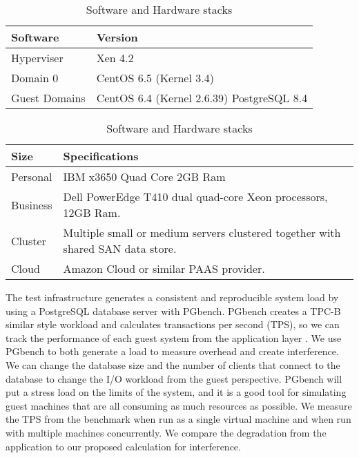 \begin{table}[h]
\begin{subtable}[h]{0.45\textwidth}
\begin{tabular}{ l p{5cm} }
  Software & Version \\
  \hline
  Hyperviser & Xen 4.2 \\
  Domain 0 & CentOS 6.5 (Kernel 3.4) \\
  Guest Domains & CentOS 6.4 (Kernel 2.6.39) PostgreSQL 8.4 \\
  \hline
\end{tabular}
\caption{Software installed virtualization test stack}
\label{softStack}
\end{subtable}
\hfill
\begin{subtable}[h]{0.45\textwidth}
\begin{tabular}{ l p{5cm} }
  Size & Specifications \\
  \hline
  Personal & IBM x3650 Quad Core 2GB Ram \\
  Business & Dell PowerEdge T410 dual quad-core Xeon processors, 12GB Ram. \\
  Cluster & Multiple small or medium servers clustered together with shared SAN data store. \\
  Cloud & Amazon Cloud or similar PAAS provider. \\
  \hline
\end{tabular}
\caption{Virtualization sizes for tests}
\label{virtSize}
\end{subtable}
\caption{Software and Hardware stacks}
\end{table}

The test infrastructure generates a consistent and reproducible system load by using a PostgreSQL database server with PGbench.  
 PGbench creates a TPC-B similar style workload and calculates transactions per second (TPS), so we can track the performance of each guest system from the application layer \cite{pgTune}.  
 We use PGbench to both generate a load to measure overhead and create interference.  
 We can change the database size and the number of clients that connect to the database to change the I/O workload from the guest perspective.
PGbench will put a stress load on the limits of the system, and it is a good tool for simulating guest machines that are all consuming as much resources as possible.  
 We measure the TPS from the benchmark when run as a single virtual machine and when run with multiple machines concurrently.  We compare the degradation from the application to our proposed calculation for interference.

